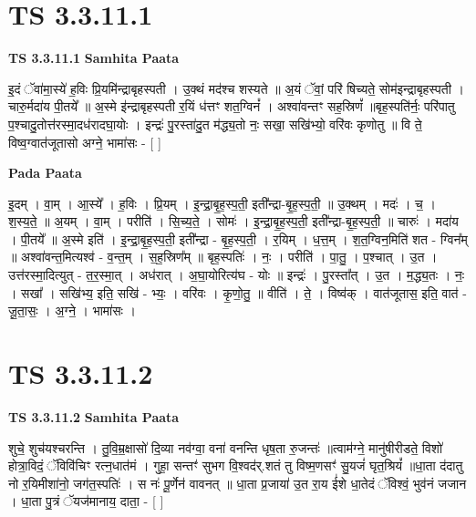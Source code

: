 \documentclass[17pt]{extarticle}
\begin{document}
\section*{ TS 3.3.11.1 }

\textbf{TS 3.3.11.1 } \newline
\textbf{Samhita Paata} \newline

इ॒दं ॅवा॑मा॒स्ये॑ ह॒विः प्रि॒यमि॑न्द्राबृहस्पती । उ॒क्थं मद॑श्च शस्यते ॥ अ॒यं ॅवां॒ परि॑ षिच्यते॒ सोम॑इन्द्राबृहस्पती । चारु॒र्मदा॑य पी॒तये᳚ ॥ अ॒स्मे इ॑न्द्राबृहस्पती र॒यिं ध॑त्तꣳ शत॒ग्विनं᳚ । अश्वा॑वन्तꣳ सह॒स्रिणं᳚ ॥बृह॒स्पति॑र्नः॒ परि॑पातु प॒श्चादु॒तोत्त॑रस्मा॒दध॑रादघा॒योः । इन्द्रः॑ पु॒रस्ता॑दु॒त म॑द्ध्य॒तो नः॒ सखा॒ सखि॑भ्यो॒ वरि॑वः कृणोतु ॥ वि ते॒ विष्व॒ग्वात॑जूतासो अग्ने॒ भामा॑सः - [  ] \newline

\textbf{Pada Paata} \newline

इ॒दम् । वा॒म् । आ॒स्ये᳚ । ह॒विः । प्रि॒यम् । इ॒न्द्रा॒बृ॒ह॒स्प॒ती॒ इती᳚न्द्रा-बृ॒ह॒स्प॒ती॒ ॥ उ॒क्थम् । मदः॑ । च॒ । श॒स्य॒ते॒ ॥ अ॒यम् । वा॒म् । परीति॑ । सि॒च्य॒ते॒ । सोमः॑ । इ॒न्द्रा॒बृ॒ह॒स्प॒ती॒ इती᳚न्द्रा-बृ॒ह॒स्प॒ती॒ ॥ चारुः॑ । मदा॑य । पी॒तये᳚ ॥ अ॒स्मे इति॑ । इ॒न्द्रा॒बृ॒ह॒स्प॒ती॒ इती᳚न्द्रा - बृ॒ह॒स्प॒ती॒ । र॒यिम् । ध॒त्त॒म् । श॒त॒ग्विन॒मिति॑ शत - ग्विन᳚म् ॥ अश्वा॑वन्त॒मित्यश्व॑ - व॒न्त॒म् । स॒ह॒स्रिण᳚म् ॥ बृह॒स्पतिः॑ । नः॒ । परीति॑ । पा॒तु॒ । प॒श्चात् । उ॒त । उत्त॑रस्मा॒दित्युत् - त॒र॒स्मा॒त् । अध॑रात् । अ॒घा॒योरित्य॑घ - योः ॥ इन्द्रः॑ । पु॒रस्ता᳚त् । उ॒त । म॒द्ध्य॒तः । नः॒ । सखा᳚ । सखि॑भ्य॒ इति॒ सखि॑ - भ्यः॒ । वरि॑वः । कृ॒णो॒तु॒ ॥ वीति॑ । ते॒ । विष्व॑क् । वात॑जूतास॒ इति॒ वात॑ - जू॒ता॒सः॒ । अ॒ग्ने॒ । भामा॑सः ।  \newline




\section*{ TS 3.3.11.2 }

\textbf{TS 3.3.11.2 } \newline
\textbf{Samhita Paata} \newline

शुचे॒ शुच॑यश्चरन्ति । तु॒वि॒म्र॒क्षासो॑ दि॒व्या नव॑ग्वा॒ वना॑ वनन्ति धृष॒ता रु॒जन्तः॑ ॥त्वाम॑ग्ने॒ मानु॑षीरीडते॒ विशो॑ होत्रा॒विदं॒ ॅविवि॑चिꣳ रत्न॒धात॑मं । गुहा॒ सन्तꣳ॑ सुभग वि॒श्वद॑र्.शतं तु विष्म॒णसꣳ॑ सु॒यजं॑ घृत॒श्रियं᳚ ॥धा॒ता द॑दातु नो र॒यिमीशा॑नो॒ जग॑त॒स्पतिः॑ । स नः॑ पू॒र्णेन॑ वावनत् ॥ धा॒ता प्र॒जाया॑ उ॒त रा॒य ई॑शे धा॒तेदं ॅविश्वं॒ भुव॑नं जजान । धा॒ता पु॒त्रं ॅयज॑मानाय॒ दाता॒ - [  ] \newline
\end{document}
